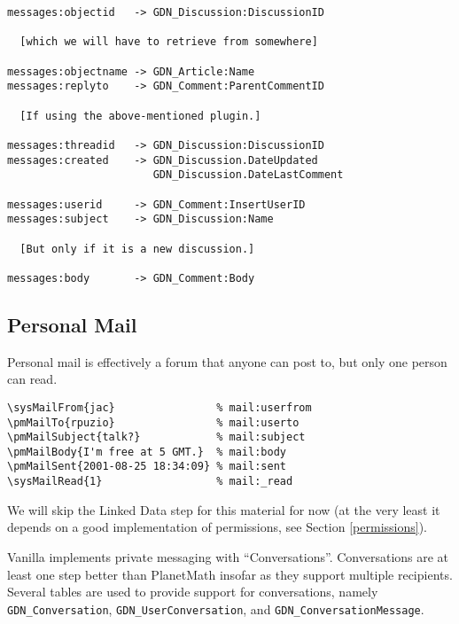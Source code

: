 \documentclass{article}
\begin{document}
\begin{verbatim}
messages:objectid   -> GDN_Discussion:DiscussionID

  [which we will have to retrieve from somewhere]

messages:objectname -> GDN_Article:Name
messages:replyto    -> GDN_Comment:ParentCommentID

  [If using the above-mentioned plugin.]

messages:threadid   -> GDN_Discussion:DiscussionID
messages:created    -> GDN_Discussion.DateUpdated
                       GDN_Discussion.DateLastComment

messages:userid     -> GDN_Comment:InsertUserID
messages:subject    -> GDN_Discussion:Name

  [But only if it is a new discussion.]

messages:body       -> GDN_Comment:Body
\end{verbatim}

\subsection{Personal Mail}

Personal mail is effectively a forum that anyone can post
to, but only one person can read.

\begin{verbatim}
\sysMailFrom{jac}                % mail:userfrom
\pmMailTo{rpuzio}                % mail:userto
\pmMailSubject{talk?}            % mail:subject
\pmMailBody{I'm free at 5 GMT.}  % mail:body
\pmMailSent{2001-08-25 18:34:09} % mail:sent
\sysMailRead{1}                  % mail:_read
\end{verbatim}

We will skip the Linked Data step for this material for
now (at the very least it depends on a good implementation
of permissions, see Section \ref{permissions}).

Vanilla implements private messaging with
``Conversations''.  Conversations are at least one step
better than PlanetMath insofar as they support multiple
recipients.  Several tables are used to provide support
for conversations, namely \verb|GDN_Conversation|,
\verb|GDN_UserConversation|, and
\verb|GDN_ConversationMessage|.
\end{document}
